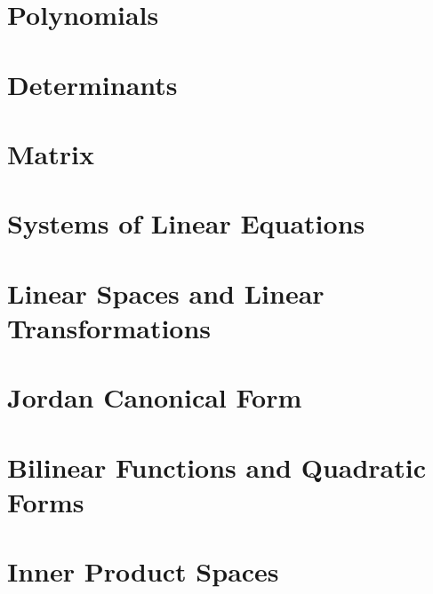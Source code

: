 \documentclass{report}
\begin{document}
	
	\thispagestyle{empty}
	\newpage%
	\tableofcontents
  
  \chapter{Polynomials}
  
  \chapter{Determinants}
  
  \chapter{Matrix}
  
  \chapter{Systems of Linear Equations}
  
  \chapter{Linear Spaces and Linear Transformations}
  
  \chapter{Jordan Canonical Form}
  
  \chapter{Bilinear Functions and Quadratic Forms}
  
  \chapter{Inner Product Spaces}
  
  


  


  
\end{document}
